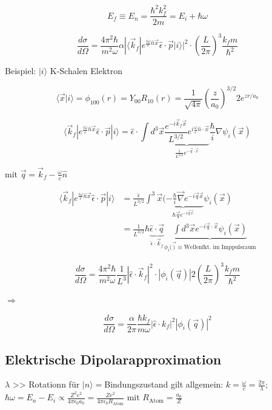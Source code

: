 \[E_f\equiv E_n = \frac{\hbar^2k_f^2}{2m} = E_i +\hbar\omega\]

\[\frac{d\sigma}{d\Omega} = \frac{4\pi^2\hbar}{m^2\omega}\alpha  |\langle \vec k_f|e^{\frac{i\omega}{c}\hat n\vec x}\hat \epsilon\cdot\vec p|i\rangle|^2\cdot \left( \frac{L}{2\pi}\right)^3 \frac{k_f m}{\hbar^2}\]

Beispiel: \(|i\rangle\) K-Schalen Elektron

\[\langle \vec x|i\rangle =\phi_{100}(r) = Y_{00}R_{10}(r) = \frac{1}{\sqrt{4\pi}}\left( \frac{z}{a_0} \right)^{3/2} 2 e^{zr/a_0}\]



\[\langle \vec k_f|e^{\frac{i\omega}{c}\hat n\vec x}\hat \epsilon\cdot\vec p|i\rangle = \hat\epsilon\cdot\int d^3\vec x \underbrace{\frac{e^{-i\vec k_f\vec x}}{L^{3/2}}e^{i\frac{\omega}{c}\hat n\cdot\vec x}}_{\frac{1}{L^{3/2}}e^{-\vec q\cdot \vec x}}\frac{\hbar}{i}\nabla \psi_i(\vec x)\]

mit \(\boxed{\vec q = \vec k_f -\frac{\omega}{c}\hat n}\)

\begin{align}
  \langle \vec k_f|e^{\frac{i\omega}{c}\hat n\vec x}\hat \epsilon\cdot\vec p|i\rangle &= \frac{\hat \epsilon}{L^{3/2}} \int^3\vec x \underbrace{(-\frac{\hbar}{i}\vec\nabla e^{-i\vec q \vec x}}_{\hbar \vec q e^{-i\vec q\vec x}}\psi_i(\vec x)\\
  &=\frac{1}{L^{3/2}}\hbar \underbrace{\hat\epsilon\cdot\vec q}_{\hat \epsilon\cdot \vec k_f}\underbrace{\int d^3\vec x e^{-i\vec q\cdot\vec x}\psi_i(\vec x)}_{\phi_i(\vec )\equiv\text{Wellenfkt. im Imppulsraum}}
\end{align}



\[\frac{d\sigma}{d\Omega} = \frac{4\pi^2\hbar}{m^2\omega} \frac{1}{L^3}|\hat \epsilon\cdot\vec k_f|^2\cdot |\phi_i(\vec q)| 2\left(\frac{L}{2\pi}\right)^3\frac{k_fm}{\hbar^2}\]

\(\Rightarrow\)

\[\boxed{\frac{d\sigma}{d\Omega} = \frac{\alpha}{2\pi} \frac{\hbar k_f}{m\omega}|\hat \epsilon\cdot k_f|^2|\phi_i(\vec q)|^2  }\]

\subsection{Elektrische Dipolarapproximation}

\(\lambda\) >> Rotationn für \(|n\rangle=\)Bindungszustand gilt allgemein: \(k=\frac{\omega}{c}=\frac{2\pi}{\lambda}\); \(\hbar\omega = E_n-E_i\propto \frac{Z^2e^2}{4\pi\epsilon_0 a_0}=\frac{Ze^2}{4\pi\epsilon_0 R_{\text{Atom}}}\) mit \(R_{\text{Atom}}=\frac{a_0}{Z}\)

